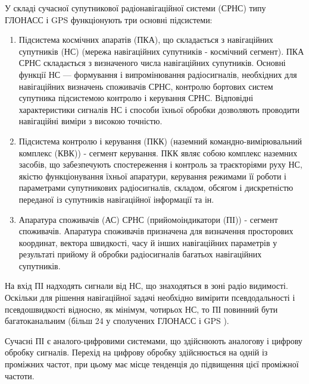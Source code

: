 У складі сучасної супутникової радіонавігаційної системи (СРНС) типу ГЛОНАСС і
GPS функціонують три основні підсистеми:

\begin{enumerate}
\item Підсистема космічних апаратів (ПКА), що складається з навігаційних супутників (НС)
(мережа навігаційних супутників - космічний сегмент). ПКА СРНС складається з визначеного 
числа навігаційних супутників. Основні функції НС --- формування і випромінювання 
радіосигналів, необхідних для навігаційних визначень споживачів СРНС, контролю бортових 
систем супутника підсистемою контролю і керування СРНС. Відповідні характеристики сигналів 
НС і способи їхньої обробки дозволяють проводити навігаційні виміри з високою точністю.
 \item Підсистема контролю і керування (ПКК) (наземний командно-вимірювальний комплекс (КВК)) - 
сегмент керування. ПКК являє собою комплекс наземних засобів, що забезпечують 
спостереження і контроль за траєкторіями руху НС, якістю функціонування їхньої апаратури, 
керування режимами її роботи і параметрами супутникових радіосигналів, складом, обсягом і 
дискретністю переданої із супутників навігаційної інформації та ін.
\item Апаратура споживачів (АС) СРНС (прийомоіндикатори (ПІ)) - сегмент споживачів.
Апаратура споживачів призначена для визначення просторових координат, вектора швидкості, 
часу й інших навігаційних параметрів у результаті прийому й обробки радіосигналів багатьох 
навігаційних супутників.
\end{enumerate}

На вхід ПІ надходять сигнали від НС, що знаходяться в зоні радіо видимості. Оскільки для 
рішення навігаційної задачі необхідно вимірити псевдодальності і псевдошвидкості відносно, 
як мінімум, чотирьох НС, то ПІ повинний бути багатоканальним (більш 24 у сполучених ГЛОНАСС і GPS ).

Сучасні ПІ є аналого-цифровими системами, що здійснюють аналогову і цифрову обробку 
сигналів. Перехід на цифрову обробку здійснюється на одній із проміжних частот, при 
цьому має місце тенденція до підвищення цієї проміжної частоти.

